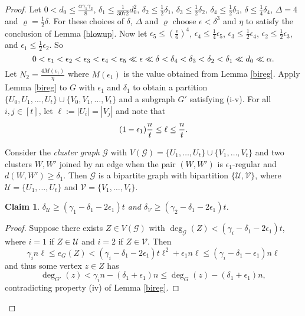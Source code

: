 \documentclass[oneside,12pt]{memoir}
\newtheorem{claim}[theorem]{Claim}
\newcommand{\ep}{\epsilon}
\newcommand{\g}{\gamma}
\newcommand{\half}{\frac{1}{2}}
\begin{document}
\begin{proof} Let $0<d_{0}\leq\frac{\alpha\g_{1}\g_{2}}{8}$,
$\delta_{1}\leq\frac{1}{3072}d_{0}^{2}$, $\delta_{2}\leq\frac{1}{2}\delta_{1}$,
$\delta_{3}\leq\frac{1}{2}\delta_{2}$, $\delta_{4}\leq\half\delta_{3}$,
$\delta\leq\frac{1}{4}\delta_{4}$, $\Delta=4$ and $\varrho=\half\delta$.
For these choices of $\delta$, $\Delta$ and $\varrho$ choose $\ep<\delta^{3}$
and $\eta$ to satisfy the conclusion of Lemma \ref{blowup}. Now let
$\ep_{5}\leq\left(\frac{\ep}{6}\right)^{4}$, $\ep_{4}\leq\frac{1}{4}\ep_{5}$,
$\ep_{3}\leq\frac{1}{2}\ep_{4}$, $\ep_{2}\leq\half\ep_{3}$, and $\ep_{1}\leq\half\ep_{2}$. So \begin{equation}
0<\ep_{1}<\ep_{2}<\ep_{3}<\ep_{4}<\ep_{5}\ll\ep\ll\delta<\delta_{4}<\delta_{3}<\delta_{2}<\delta_{1}\ll d_{0}\ll\alpha.\notag\end{equation}
Let 
$N_2=\frac{4M(\ep_1)}{\eta}$
where
$M(\ep_1)$ 
is the value obtained from Lemma \ref{bireg}. Apply Lemma \ref{bireg} to $G$ with $\ep_1$ and $\delta_1$ to obtain a partition
$\{U_0,U_{1},\dots,U_{t}\}\cup\{V_0,V_{1},\dots,V_{t}\}$ and a subgraph $G'$ satisfying (i-v). For all $i,j\in [t]$, let $\ell:=|U_i|=|V_j|$ and note that \begin{equation}(1-\ep_1)\frac{n}{t}\leq\ell\leq\frac{n}{t}.\notag\end{equation}

Consider the \emph{cluster graph} $\mathcal{G}$ with $V(\mathcal{G})=\{U_{1},\dots,U_{t}\}\cup\{V_{1},\dots,V_{t}\}$
and two clusters $W,W'$ joined by an edge when the pair $(W,W')$
is $\ep_{1}$-regular and $d(W,W')\geq\delta_{1}$. Then $\mathcal{G}$
is a bipartite graph with bipartition $\{\mathcal{U},\mathcal{V}\}$,
where $\mathcal{U}=\{U_{1},\dots,U_{t}\}$ and $\mathcal{V}=\{V_{1},\dots,V_{t}\}$.  

\begin{claim} \label{cldeg}
$\delta_{\mathcal{U}}\geq(\g_{1}-\delta_{1}-2\ep_{1})t$ and $\delta_{\mathcal{V}}\geq(\g_{2}-\delta_{1}-2\ep_{1})t$.
\end{claim}

\begin{proof}
Suppose there exists $Z\in V(\mathcal{G})$ with
$\deg_{\mathcal{G}}(Z)<(\g_{i}-\delta_{1}-2\ep_{1})t$, where $i=1$
if $Z\in\mathcal{U}$ and $i=2$ if $Z\in\mathcal{V}$. Then 
$$\gamma_in\ell \leq e_G(Z) < (\gamma_i-\delta_1-2\ep_1)t\ell^2 +\ep_1n\ell\leq (\gamma_i-\delta_1-\ep_1)n\ell$$
and thus some vertex $z\in Z$ has $$\deg_{G'}(z)< \gamma_in-(\delta_1+\ep_1)n\leq  \deg_G(z)-(\delta_1+\ep_1)n,$$ contradicting property (iv) of Lemma \ref{bireg}. 
\end{proof}



\end{proof}
\end{document}
